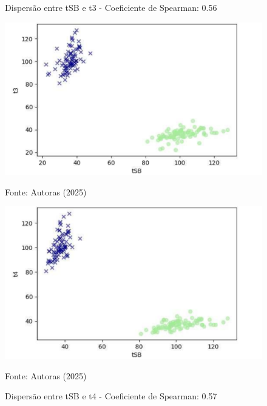 \begin{figure}[h]
    \captionsetup{font=footnotesize, justification=centering, labelsep=period, position=above}
    \centering
    \begin{minipage}[b]{0.45\linewidth}
        \caption{Dispersão entre tSB e t3 - Coeficiente de Spearman: 0.56}
        \label{fig:tSB-t3}
        \centering
        \includegraphics[scale=0.35]{figuras/Spearman/tSB-t3.pdf}
        \vspace{0.3cm}
        \begin{minipage}{\linewidth}
            \centering
            \scriptsize{Fonte: Autoras (2025)}
        \end{minipage}
    \end{minipage}
    \hspace{0.05\linewidth}
    \begin{minipage}[b]{0.45\linewidth}
        \caption{Dispersão entre tSB e t4 - Coeficiente de Spearman: 0.57}
        \label{fig:tSB-t4}
        \centering
        \includegraphics[scale=0.35]{figuras/Spearman/tSB-t4.pdf}
        \vspace{0.3cm}
        \begin{minipage}{\linewidth}
            \centering
            \scriptsize{Fonte: Autoras (2025)}
        \end{minipage}
    \end{minipage}
\end{figure}
\FloatBarrier

